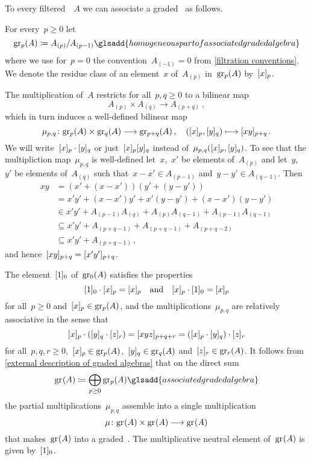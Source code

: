 \begin{construction}
	\label{construction of associated graded}
	To every filtered~{\algebra{$\kf$}}~$A$ we can associate a graded~{\algebra{$\kf$}} as follows.

	For every~$p \geq 0$ let
	\[
		\gr[p](A)
		\defined
		A_{(p)} / A_{(p-1)}
		\glsadd{homogeneous part of associated graded algebra}
	\]
	where we use for~$p = 0$ the convention~$A_{(-1)} = 0$ from \cref{filtration conventions}.
	We denote the residue class of an element~$x$ of~$A_{(p)}$ in~$\gr[p](A)$ by~$\lbrack x\rbrack_p$.
	
	The multiplication of~$A$ restricts for all~$p, q \geq 0$ to a bilinear map
	\[
		A_{(p)} \times A_{(q)} \to A_{(p+q)} \,,
	\]
	which in turn induces a well-defined bilinear map
	\[
		\mu_{p,q}
		\colon
		\gr[p](A) \times \gr[q](A)
		\to
		\gr[p+q](A) \,,
		\quad
		(\fclass{x}_p, \fclass{y}_q)
		\mapsto
		\fclass{xy}_{p+q}  \,.
	\]
	We will write~$\lbrack x\rbrack_p \cdot \lbrack y\rbrack_q$ or just~$\lbrack x\rbrack_p \lbrack y\rbrack_q$ instead of~$\mu_{p,q}(\lbrack x\rbrack_p, \lbrack y\rbrack_q)$.
	To see that the multipliction map~$\mu_{p,q}$ is well-defined let~$x$,~$x'$ be elements of~$A_{(p)}$ and let~$y$,~$y'$ be elements of~$A_{(q)}$ such that~$x - x ' \in A_{(p-1)}$ and~$y - y' \in A_{(q-1)}$.
	Then
	\begin{align*}
		x y
		&=
		(x' + (x - x')) (y' + (y - y'))
		\\
		&=
		x' y' + (x - x') y' + x' (y - y') + (x - x')(y - y')
		\\
		&\in
		x' y' + A_{(p-1)} A_{(q)} + A_{(p)} A_{(q-1)} + A_{(p-1)} A_{(q-1)}
		\\
		&\subseteq
		x' y' + A_{(p+q-1)} + A_{(p+q-1)} + A_{(p+q-2)}
		\\
		&\subseteq
		x' y' + A_{(p+q-1)} \,,
	\end{align*}
	and hence~$\lbrack xy\rbrack_{p+q} = \lbrack x'y'\rbrack_{p+q}$.
	
	The element~$\lbrack 1 \rbrack_0$ of~$\gr[0](A)$ satisfies the properties
	\[
		\lbrack1\rbrack_0 \cdot \lbrack x\rbrack_p = \lbrack x\rbrack_p
		\quad\text{and}\quad
		\lbrack x\rbrack_p \cdot \lbrack1\rbrack_0 = \lbrack x\rbrack_p
	\]
	 for all~$p \geq 0$ and~$\fclass{x}_p \in \gr[p](A)$, and the multiplications~$\mu_{p,q}$ are relatively associative in the sense that
	\[
		\lbrack x\rbrack_p \cdot (\lbrack y\rbrack_q \cdot \lbrack z\rbrack_r)
		=
		\lbrack xyz \rbrack_{p+q+r}
		=
		(\lbrack x\rbrack_p \cdot \lbrack y\rbrack_q) \cdot \lbrack z\rbrack_r
	\]
	for all~$p, q, r \geq 0$,~$\fclass{x}_p \in \gr[p](A)$,~$\fclass{y}_q \in \gr[q](A)$ and~$\fclass{z}_r \in \gr[r](A)$.
	It follows from \cref{external description of graded algebras} that on the direct sum
	\[
		\gr(A)
		\defined
		\bigoplus_{p \geq 0} \gr[p](A)
		\glsadd{associated graded algebra}
	\]
	the partial multiplications~$\mu_{p,q}$ assemble into a single multiplication
	\[
		\mu
		\colon
		\gr(A) \times \gr(A)
		\to
		\gr(A)
	\]
	that makes~$\gr(A)$ into a graded~{\algebra{$\kf$}}.
	The multiplicative neutral element of~$\gr(A)$ is given by~$\lbrack1\rbrack_0$.
\end{construction}


